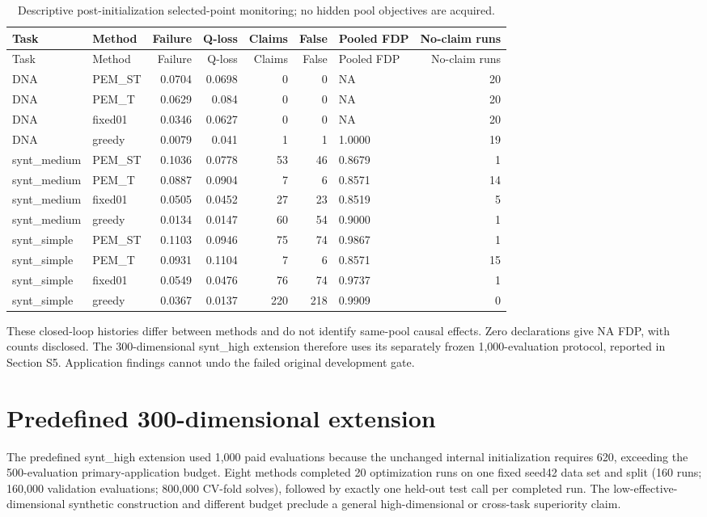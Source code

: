 \documentclass[cmc,article,submit,moreauthors,pdftex]{Definitions/tsp}
\begin{document}
\begin{longtable}[]{@{}llrrrrlr@{}}
\caption{Descriptive post-initialization selected-point monitoring; no hidden pool objectives are acquired.}\tabularnewline
\toprule
Task & Method & Failure & Q-loss & Claims & False & Pooled FDP & No-claim runs \\
\midrule
\endfirsthead
\toprule
Task & Method & Failure & Q-loss & Claims & False & Pooled FDP & No-claim runs \\
\midrule
\endhead
DNA & PEM\_ST & 0.0704 & 0.0698 & 0 & 0 & NA & 20 \\
DNA & PEM\_T & 0.0629 & 0.084 & 0 & 0 & NA & 20 \\
DNA & fixed01 & 0.0346 & 0.0627 & 0 & 0 & NA & 20 \\
DNA & greedy & 0.0079 & 0.041 & 1 & 1 & 1.0000 & 19 \\
synt\_medium & PEM\_ST & 0.1036 & 0.0778 & 53 & 46 & 0.8679 & 1 \\
synt\_medium & PEM\_T & 0.0887 & 0.0904 & 7 & 6 & 0.8571 & 14 \\
synt\_medium & fixed01 & 0.0505 & 0.0452 & 27 & 23 & 0.8519 & 5 \\
synt\_medium & greedy & 0.0134 & 0.0147 & 60 & 54 & 0.9000 & 1 \\
synt\_simple & PEM\_ST & 0.1103 & 0.0946 & 75 & 74 & 0.9867 & 1 \\
synt\_simple & PEM\_T & 0.0931 & 0.1104 & 7 & 6 & 0.8571 & 15 \\
synt\_simple & fixed01 & 0.0549 & 0.0476 & 76 & 74 & 0.9737 & 1 \\
synt\_simple & greedy & 0.0367 & 0.0137 & 220 & 218 & 0.9909 & 0 \\
\bottomrule
\end{longtable}

These closed-loop histories differ between methods and do not identify same-pool causal effects. Zero declarations give NA FDP, with counts disclosed. The 300-dimensional synt\_high extension therefore uses its separately frozen 1,000-evaluation protocol, reported in Section S5. Application findings cannot undo the failed original development gate.

\hypertarget{predefined-300-dimensional-extension}{%
\section{Predefined 300-dimensional extension}\label{predefined-300-dimensional-extension}}

The predefined synt\_high extension used 1,000 paid evaluations because the unchanged internal initialization requires 620, exceeding the 500-evaluation primary-application budget. Eight methods completed 20 optimization runs on one fixed seed42 data set and split (160 runs; 160,000 validation evaluations; 800,000 CV-fold solves), followed by exactly one held-out test call per completed run. The low-effective-dimensional synthetic construction and different budget preclude a general high-dimensional or cross-task superiority claim.
\end{document}
